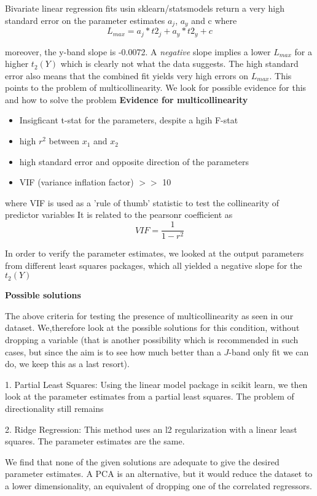 \documentclass{article}
\begin{document}
Bivariate linear regression fits usin sklearn/statsmodels return a very high standard error on the parameter estimates $a_j$, $a_y$ and c
where
\begin{equation}
L_{max}=a_j*t2_j+a_y*t2_y+c
\end{equation}

moreover, the y-band slope is -0.0072. A \emph{negative} slope implies a lower $L_{max}$ for a higher $t_2(Y)$ which is clearly not what the data suggests. The high standard error also means that the combined fit yields very high errors on $L_{max}$. This points to the problem of multicollinearity. We look for possible evidence for this and how to solve the problem
{\bf Evidence for multicollinearity}

\begin{itemize}
\item	Insigficant t-stat for the parameters, despite a hgih F-stat
\item	high $r^2$ between $x_1$ and $x_2$
\item	high standard error and opposite direction of the parameters
\item	VIF (variance inflation factor) $>>$ 10
\end{itemize}
where VIF is used as a 'rule of thumb' statistic to test the collinearity of predictor variables
It is related to the pearsonr coefficient as 
\begin{equation}
VIF=\frac{1}{1-r^2}
\end{equation}

In order to verify the parameter estimates, we looked at the output parameters from different least squares packages, which all yielded a negative slope for the $t_2(Y)$


{\bf Possible solutions}

The above criteria for testing the presence of multicollinearity as seen in our dataset. We,therefore look at the possible solutions for this condition, without dropping a variable (that is another possibility which is recommended in such cases, but since the aim is to see how much better than a $J$-band only fit we can do, we keep this as a last resort).

1. Partial Least Squares: Using the linear model package in scikit learn, we then look at the parameter estimates from a partial least squares. The problem of directionality still remains 

2. Ridge Regression: This method uses an l2 regularization with a linear least squares. The parameter estimates are the same.

We find that none of the given solutions are adequate to give the desired parameter estimates. A PCA is an alternative, but it would reduce the dataset to a lower dimensionality, an equivalent of dropping one of the correlated regressors.
\end{document}
